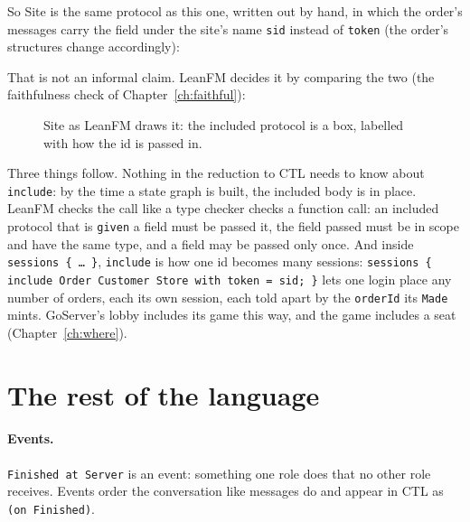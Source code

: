 So Site is the same protocol as this one, written out by hand, in which the order's
messages carry the field under the site's name \texttt{sid} instead of \texttt{token}
(the order's structures change accordingly):



That is not an informal claim. LeanFM decides it by comparing the two (the faithfulness
check of Chapter~\ref{ch:faithful}):


\begin{figure}[ht]
\centering
{}
\caption{Site as LeanFM draws it: the included protocol is a box, labelled with how the id is passed in.}
\label{fig:include}
\end{figure}

Three things follow. Nothing in the reduction to CTL needs to know about
\texttt{include}: by the time a state graph is built, the included body is in place.
LeanFM checks the call like a type checker checks a function call: an included
protocol that is \texttt{given} a field must be passed it, the field passed must be in
scope and have the same type, and a field may be passed only once. And inside
\texttt{sessions \{ \ldots\ \}}, \texttt{include} is how one id becomes many sessions:
\texttt{sessions \{ include Order Customer Store with token = sid; \}} lets one login
place any number of orders, each its own session, each told apart by the
\texttt{orderId} its \texttt{Made} mints. GoServer's lobby includes its game this way,
and the game includes a seat (Chapter~\ref{ch:where}).

\section{The rest of the language}

\paragraph{Events.} \texttt{Finished at Server} is an event: something one role does
that no other role receives. Events order the conversation like messages do and
appear in CTL as \texttt{(on Finished)}.

